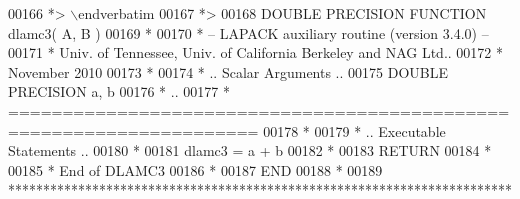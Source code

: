 \begin{DoxyCode}
00166 \textcolor{comment}{*> \(\backslash\)endverbatim}
00167 \textcolor{comment}{*>}
00168 \textcolor{keyword}{      DOUBLE PRECISION }\textcolor{keyword}{FUNCTION }dlamc3( A, B )
00169 \textcolor{comment}{*}
00170 \textcolor{comment}{*  -- LAPACK auxiliary routine (version 3.4.0) --}
00171 \textcolor{comment}{*     Univ. of Tennessee, Univ. of California Berkeley and NAG Ltd..}
00172 \textcolor{comment}{*     November 2010}
00173 \textcolor{comment}{*}
00174 \textcolor{comment}{*     .. Scalar Arguments ..}
00175       \textcolor{keywordtype}{DOUBLE PRECISION}   a, b
00176 \textcolor{comment}{*     ..}
00177 \textcolor{comment}{* =====================================================================}
00178 \textcolor{comment}{*}
00179 \textcolor{comment}{*     .. Executable Statements ..}
00180 \textcolor{comment}{*}
00181       dlamc3 = a + b
00182 \textcolor{comment}{*}
00183       \textcolor{keywordflow}{RETURN}
00184 \textcolor{comment}{*}
00185 \textcolor{comment}{*     End of DLAMC3}
00186 \textcolor{comment}{*}
00187 \textcolor{keyword}{      END}
00188 \textcolor{comment}{*}
00189 \textcolor{comment}{************************************************************************}
\end{DoxyCode}
